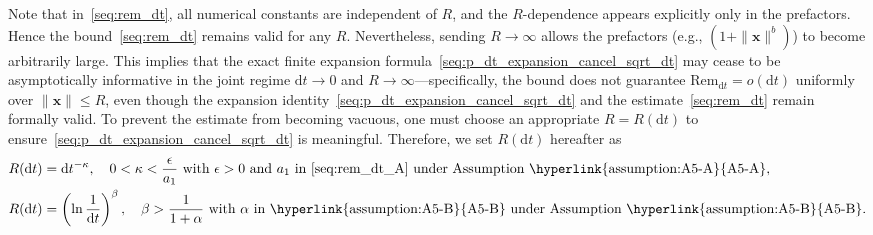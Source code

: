 \documentclass[
 longbibliography,
 twocolumn,
 superscriptaddress,
 amsmath,
 amssymb,
 amsthm,
 amsfonts,
 prl,
 floatfix,
]{revtex4-2}
\begin{document}
\begin{widetext}
Note that in~\eqref{seq:rem_dt}, all numerical constants are independent of $R$, and the $R$-dependence appears explicitly only in the prefactors. Hence the bound~\eqref{seq:rem_dt} remains valid for any $R$. Nevertheless, sending $R\rightarrow\infty$ allows the prefactors (e.g., $(1+\|\bm x\|^b)$) to become arbitrarily large. 
This implies that the exact finite expansion formula~\eqref{seq:p_dt_expansion_cancel_sqrt_dt} may cease to be asymptotically informative in the joint regime $\mathrm dt\rightarrow0$ and $R\rightarrow\infty$—specifically, the bound does not guarantee $\mathrm{Rem}_{\mathrm dt}=o(\mathrm dt)$ uniformly over $\|\bm x\|\leq R$, even though the expansion identity~\eqref{seq:p_dt_expansion_cancel_sqrt_dt} and the estimate~\eqref{seq:rem_dt} remain formally valid. 
To prevent the estimate from becoming vacuous, one must choose an appropriate $R=R(\mathrm dt)$ to ensure~\eqref{seq:p_dt_expansion_cancel_sqrt_dt} is meaningful. Therefore, we set $R(\mathrm dt)$ hereafter as
\begin{subequations}\label{seq:R_dt}
\renewcommand{\theequation}{\theparentequation-\Alph{equation}}
\begin{align}
    R(\mathrm dt)&=
    \mathrm dt^{-\kappa},
    \quad0<\kappa<\frac{\epsilon}{a_1}\text{ with }
    \epsilon>0
    \text{ and $a_1$ in~\eqref{seq:rem_dt_A} under Assumption~\hyperlink{assumption:A5-A}{A5-A}},
    \label{seq:R_dt_A}
    \\
    R(\mathrm dt)&=
    \left(\ln\frac{1}{\mathrm dt}\right)^\beta,
    \quad\beta>\frac{1}{1+\alpha}
    \text{ with $\alpha$ in~\hyperlink{assumption:A5-B}{A5-B} under Assumption~\hyperlink{assumption:A5-B}{A5-B}}.
    \label{seq:R_dt_B}
\end{align}
\end{subequations}


\end{widetext}
\end{document}
